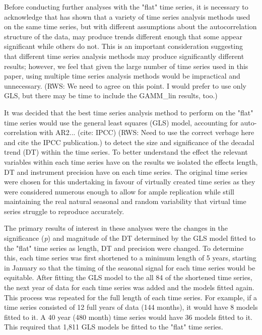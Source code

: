 \documentclass{ametsoc}
\begin{document}
Before conducting further analyses with the "flat" time series, it is necessary to acknowledge that \citet{Franzke2012} has shown that a variety of time series analysis methods used on the same time series, but with different assumptions about the autocorrelation structure of the data, may produce trends different enough that some appear significant while others do not. This is an important consideration suggesting that different time series analysis methods may produce significantly different results; however, we feel that given the large number of time series used in this paper, using multiple time series analysis methods would be impractical and unnecessary. (RWS: We need to agree on this point. I would prefer to use only GLS, but there may be time to include the GAMM_lin results, too.)

It was decided that the best time series analysis method to perform on the "flat" time series would use the general least squares (GLS) model, accounting for auto-correlation with AR2... (cite: IPCC) (RWS: Need to use the correct verbage here and cite the IPCC publication.) to detect the size and significance of the decadal trend (DT) within the time series. To better understand the effect the relevant variables within each time series have on the results we isolated the effects length, DT and instrument precision have on each time series. The original time series were chosen for this undertaking in favour of virtually created time series as they were considered numerous enough to allow for ample replication while still maintaining the real natural seasonal and random variability that virtual time series struggle to reproduce accurately.

The primary results of interest in these analyses were the changes in the significance (\emph{p}) and magnitude of the DT determined by the GLS model fitted to the "flat" time series as length, DT and precision were changed. To determine this, each time series was first shortened to a minimum length of 5 years, starting in January so that the timing of the seasonal signal for each time series would be equitable. After fitting the GLS model to the all 84 of the shortened time series, the next year of data for each time series was added and the models fitted again. This process was repeated for the full length of each time series. For example, if a time series consisted of 12 full years of data (144 months), it would have 8 models fitted to it. A 40 year (480 month) time series would have 36 models fitted to it. This required that 1,811 GLS models be fitted to the "flat" time series. 
\end{document}
